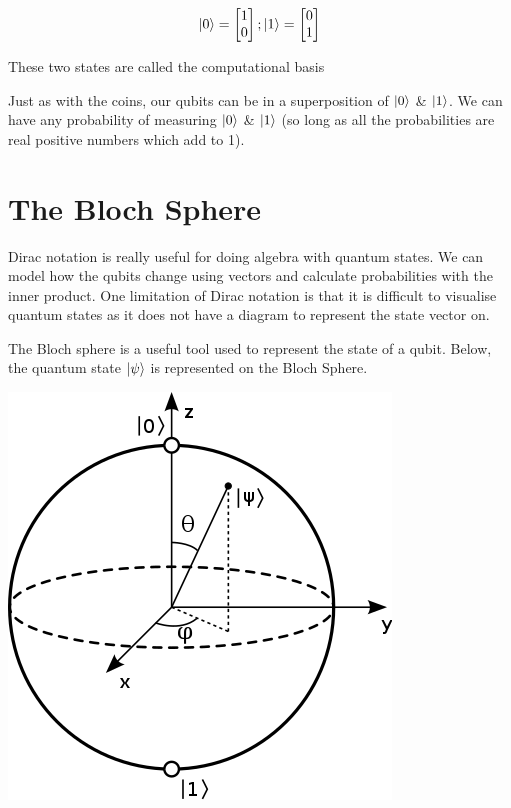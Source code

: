 \documentclass{book}
\begin{document}
$$
\ket{0} = \begin{bmatrix} 1 \\ 0 \end{bmatrix} ; \ket{1} = \begin{bmatrix} 0 \\ 1 \end{bmatrix} 
$$

These two states are called the computational basis

Just as with the coins, our qubits can be in a superposition of $\ket{0}$ & $\ket{1}$. We can have any probability of measuring $\ket{0}$ & $\ket{1}$ (so long as all the probabilities are real positive numbers which add to 1). 

\section{ The Bloch Sphere }

Dirac notation is really useful for doing algebra with quantum states. We can model how the qubits change using vectors and calculate probabilities with the inner product. One limitation of Dirac notation is that it is difficult to visualise quantum states as it does not have a diagram to represent the state vector on. 

The Bloch sphere is a useful tool used to represent the state of a qubit. Below, the quantum state $\ket{\psi}$ is represented on the Bloch Sphere. 


\includegraphics[scale=0.5]{images/Bloch_Sphere.png}
\end{document}

